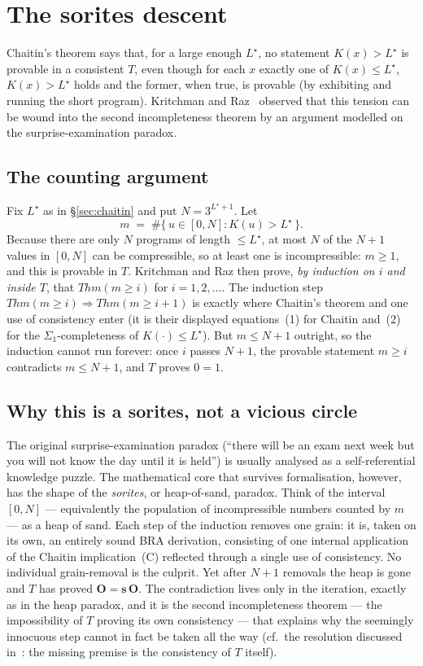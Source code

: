 \documentclass[11pt]{article}
\theoremstyle{plain}
\theoremstyle{definition}
\theoremstyle{remark}
\newcommand{\Kc}{K}
\newcommand{\Thm}[1]{\mathit{Thm}(#1)}
\newcommand{\Lstar}{L^{\!\star}}
\begin{document}
\section{The sorites descent}
\label{sec:sorites}

Chaitin's theorem says that, for a large enough $\Lstar$, no statement
$\Kc(x)>\Lstar$ is provable in a consistent $T$, even though for each
$x$ exactly one of $\Kc(x)\le\Lstar$, $\Kc(x)>\Lstar$ holds and the
former, when true, is provable (by exhibiting and running the short
program). Kritchman and Raz~\cite{KritchmanRaz} observed that this
tension can be wound into the second incompleteness theorem by an
argument modelled on the surprise-examination paradox.

\subsection{The counting argument}

Fix $\Lstar$ as in \S\ref{sec:chaitin} and put $N = 3^{\Lstar+1}$. Let
\[
  m \;=\; \#\{\,u \in [0,N] : \Kc(u) > \Lstar\,\}.
\]
Because there are only $N$ programs of length $\le\Lstar$, at most $N$ of
the $N+1$ values in $[0,N]$ can be compressible, so at least one is
incompressible: $m \ge 1$, and this is provable in $T$. Kritchman and Raz
then prove, \emph{by induction on $i$ and inside $T$}, that
$\Thm{m \ge i}$ for $i = 1, 2, \dots$. The induction step
$\Thm{m\ge i}\Rightarrow\Thm{m\ge i{+}1}$ is exactly where Chaitin's
theorem and one use of consistency enter (it is their displayed
equations~(1) for Chaitin and~(2) for the $\Sigma_1$-completeness of
$\Kc(\cdot)\le\Lstar$). But $m \le N+1$ outright, so the induction cannot
run forever: once $i$ passes $N+1$, the provable statement $m \ge i$
contradicts $m \le N+1$, and $T$ proves $0=1$.

\subsection{Why this is a sorites, not a vicious circle}

The original surprise-examination paradox (``there will be an exam next
week but you will not know the day until it is held'') is usually
analysed as a self-referential knowledge puzzle. The mathematical core
that survives formalisation, however, has the shape of the
\emph{sorites}, or heap-of-sand, paradox. Think of the interval $[0,N]$
--- equivalently the population of incompressible numbers counted by $m$
--- as a heap of sand. Each step of the induction removes one grain: it
is, taken on its own, an entirely sound BRA derivation, consisting of one
internal application of the Chaitin implication~(C) reflected through a
single use of consistency. No individual grain-removal is the culprit.
Yet after $N+1$ removals the heap is gone and $T$ has proved
$\mathbf{O}=\mathbf{s}\,\mathbf{O}$. The contradiction lives only in the
iteration, exactly as in the heap paradox, and it is the second
incompleteness theorem --- the impossibility of $T$ proving its own
consistency --- that explains why the seemingly innocuous step cannot in
fact be taken all the way (cf.\ the resolution discussed
in~\cite{KritchmanRaz}: the missing premise is the consistency of $T$
itself).
\end{document}
